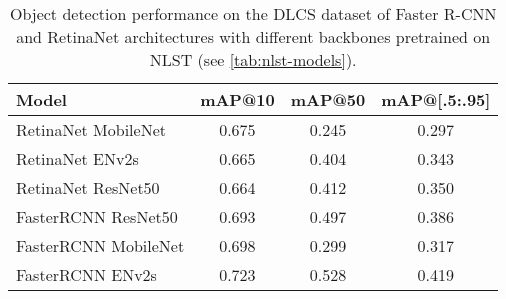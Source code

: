 \begin{table}[h]
    \centering
    \caption{Object detection performance on the DLCS dataset of Faster R-CNN and RetinaNet architectures with different backbones pretrained on NLST (see \ref{tab:nlst-models}).}
    \label{tab:dlcs-models-not-pretrained}
    \begin{tabular}{lccc}
    \hline
    \textbf{Model} & \textbf{mAP@10} & \textbf{mAP@50} & \textbf{mAP@[.5:.95]} \\
    \hline
    RetinaNet MobileNet  & 0.675 & 0.245 & 0.297 \\
    RetinaNet ENv2s      & 0.665 & 0.404 & 0.343 \\
    RetinaNet ResNet50   & 0.664 & 0.412 & 0.350 \\
    FasterRCNN ResNet50  & 0.693 & 0.497 & 0.386 \\
    FasterRCNN MobileNet & 0.698 & 0.299 & 0.317 \\
    FasterRCNN ENv2s     & 0.723 & 0.528 & 0.419 \\
    \hline
    \end{tabular}
\end{table}